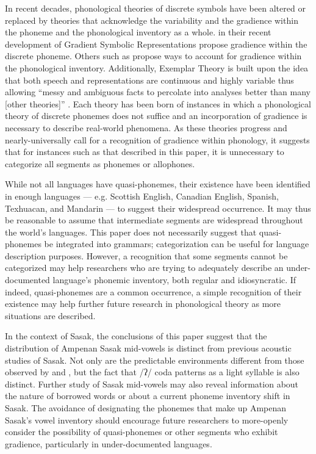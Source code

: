 \documentclass[12pt]{ouparticle}
\begin{document}
In recent decades, phonological theories of discrete symbols have been altered or replaced by theories that acknowledge the variability and the gradience within the phoneme and the phonological inventory as a whole. \citet{smolensky2016} in their recent development of Gradient Symbolic Representations propose gradience within the discrete phoneme. Others such as \citet{hall2009,hall2012,hall2013} propose ways to account for gradience within the phonological inventory. Additionally, Exemplar Theory is built upon the idea that both speech and representations are continuous and highly variable \citep{goldinger1998, johnson2005} thus allowing “messy and ambiguous facts to percolate into analyses better than many [other theories]” \citep[16]{scobbie2008}. Each theory has been born of instances in which a phonological theory of discrete phonemes does not suffice and an incorporation of gradience is necessary to describe real-world phenomena. As these theories progress and nearly-universally call for a recognition of gradience within phonology, it suggests that for instances such as that described in this paper, it is unnecessary to categorize all segments as phonemes or allophones. 

While not all languages have quasi-phonemes, their existence have been identified in enough languages --- e.g. Scottish English, Canadian English, Spanish, Texhuacan, and Mandarin --- to suggest their widespread occurrence. It may thus be reasonable to assume that intermediate segments are widespread throughout the world's languages. This paper does not necessarily suggest that quasi-phonemes be integrated into grammars; categorization can be useful for language description purposes. However, a recognition that some segments cannot be categorized may help researchers who are trying to adequately describe an under-documented language's phonemic inventory, both regular and idiosyncratic. If indeed, quasi-phonemes are a common occurrence, a simple recognition of their existence may help further future research in phonological theory as more situations are described.

In the context of Sasak, the  conclusions of this paper suggest that the distribution of Ampenan Sasak mid-vowels is distinct from previous acoustic studies of Sasak. Not only are the predictable environments different from those observed by \citet{chahal1998} and \citet{archangeli2018}, but the fact that /ʔ/ coda patterns as a light syllable is also distinct. Further study of Sasak mid-vowels may also reveal information about the nature of borrowed words or about a current phoneme inventory shift in Sasak. The avoidance of designating the phonemes that make up Ampenan Sasak's vowel inventory should encourage future researchers to more-openly consider the possibility of quasi-phonemes or other segments who exhibit gradience, particularly in under-documented languages.
\end{document}
